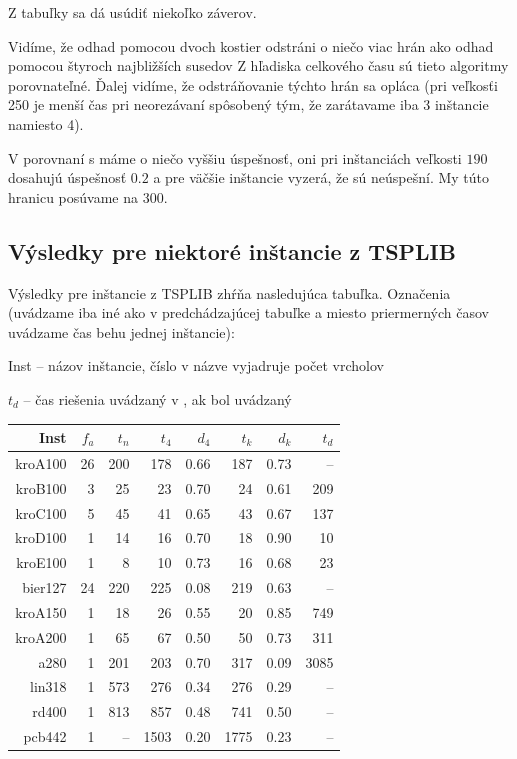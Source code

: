 Z tabuľky sa dá usúdiť niekoľko záverov.

Vidíme, že odhad pomocou dvoch kostier odstráni o niečo viac hrán ako odhad pomocou štyroch najbližších susedov
Z hľadiska celkového času sú tieto algoritmy
porovnateľné. Ďalej vidíme, že odstráňovanie týchto hrán sa opláca (pri veľkosťi 250 je menší
čas pri neorezávaní spôsobený tým, že zarátavame iba 3 inštancie namiesto 4).

V porovnaní s \cite{duchenne} máme o niečo vyššiu úspešnosť, oni pri inštanciách
veľkosti $190$ dosahujú úspešnosť $0.2$ a pre väčšie inštancie vyzerá, že sú neúspešní.
My túto hranicu posúvame na $300$.

\subsection{Výsledky pre niektoré inštancie z TSPLIB}

Výsledky pre inštancie z TSPLIB zhŕňa nasledujúca tabuľka. 
Označenia (uvádzame iba iné ako v predchádzajúcej tabuľke a miesto priermerných časov uvádzame čas
behu jednej inštancie):
\begin{myitemize}
\item Inst -- názov inštancie, číslo v názve vyjadruje počet vrcholov
\item $t_d$ -- čas riešenia uvádzaný v \cite{duchenne}, ak bol uvádzaný
\end{myitemize}

\begin{table}[h]
\centering
\begin{tabular}{|r|r|r|r|r|r|r|r|}
\hline
Inst    &$f_a$&$t_n$&$t_4$&$d_4$&$t_k$&$d_k$&$t_d$ \\\hline
kroA100 & 26  & 200 & 178& 0.66 & 187 & 0.73& -- \\\hline
kroB100 & 3   & 25  & 23 & 0.70 & 24  & 0.61& 209 \\\hline 
kroC100 & 5   & 45  & 41 & 0.65 & 43  & 0.67& 137 \\\hline
kroD100 & 1   & 14  & 16 & 0.70 & 18  & 0.90& 10 \\\hline
kroE100 & 1   & 8   & 10 & 0.73 & 16  & 0.68& 23 \\\hline
bier127 & 24  & 220 & 225& 0.08 & 219 & 0.63& -- \\\hline 
kroA150 & 1   & 18  & 26 & 0.55 & 20  & 0.85& 749 \\\hline
kroA200 & 1   & 65  & 67 & 0.50 & 50  & 0.73& 311 \\\hline
a280    & 1   & 201 & 203& 0.70 & 317 & 0.09& 3085 \\\hline
lin318  & 1   & 573 & 276& 0.34 & 276 & 0.29& -- \\\hline
rd400   & 1   & 813 & 857& 0.48 & 741 & 0.50& -- \\\hline
pcb442  & 1   & --  &1503& 0.20 & 1775& 0.23& -- \\\hline
\end{tabular}
\end{table}

